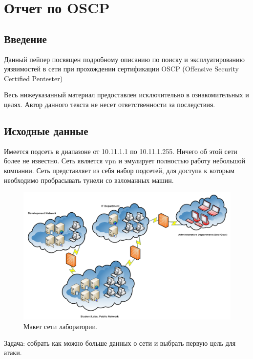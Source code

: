 \documentclass[a4paper,12pt]{article}
\begin{document}
	
\section{Отчет по OSCP}
\subsection {Введение}
Данный пейпер посвящен подробному описанию по поиску и эксплуатированию уязвимостей в сети при прохождении сертификации OSCP (Offensive Security Certified Pentester)


Весь нижеуказанный материал предоставлен исключительно в ознакомительных и целях. Автор данного текста не несет ответственности за последствия.
\subsection{Исходные данные}
Имеется подсеть в диапазоне от 10.11.1.1 по 10.11.1.255. Ничего об этой сети более не известно. Сеть является vpn и эмулирует полностью работу небольшой компании. Сеть представляет из себя набор подсетей, для доступа к которым необходимо пробрасывать тунели со взломанных машин. 

\begin{figure}[h!]
	\includegraphics[width=\linewidth]{net.png}
	\caption{Макет сети лаборатории.}
	\label{fig:boat1}
\end{figure}

Задача: собрать как можно больше данных о сети и выбрать первую цель для атаки. 
\end{document}
